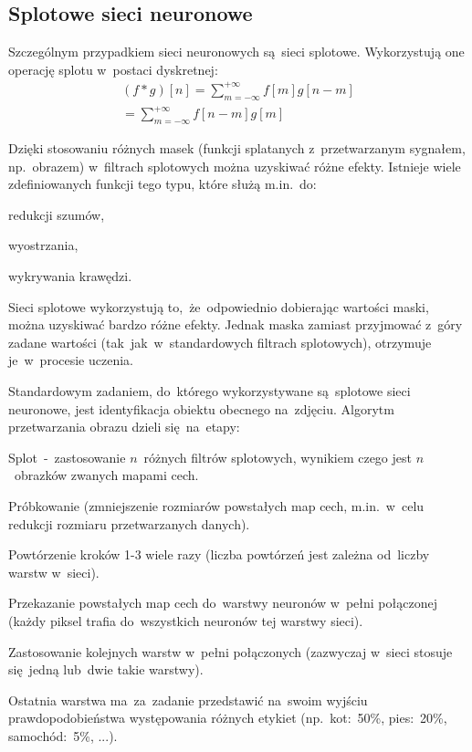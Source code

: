 \documentclass[oneside, 11pt, a4paper]{article}
\begin{document}
\begin{multicols}{2}
\section{Splotowe sieci neuronowe}
Szczególnym przypadkiem sieci neuronowych są~sieci splotowe. Wykorzystują one operację splotu w~postaci dyskretnej:
\begin{align*}
(f \ast g)[n] = \sum\limits_{m=-\infty}^{+\infty}f[m]g[n-m]\\
=\sum\limits_{m=-\infty}^{+\infty}f[n-m]g[m]
\end{align*}

Dzięki stosowaniu różnych masek (funkcji splatanych z~przetwarzanym sygnałem, np.~obrazem) w~filtrach splotowych można uzyskiwać różne efekty. Istnieje wiele zdefiniowanych funkcji tego typu, które służą m.in.~do:
\begin{compactitem}
	\item redukcji szumów,
	\item wyostrzania,
	\item wykrywania krawędzi.
\end{compactitem}

Sieci splotowe wykorzystują to,~że~odpowiednio dobierając wartości maski, można uzyskiwać bardzo różne efekty. Jednak maska zamiast przyjmować z~góry zadane wartości (tak~jak~w~standardowych filtrach splotowych), otrzymuje je~w~procesie uczenia.

Standardowym zadaniem, do~którego wykorzystywane są~splotowe sieci neuronowe, jest identyfikacja obiektu obecnego na~zdjęciu. Algorytm przetwarzania obrazu dzieli się~na~etapy:
\begin{compactenum}
	\item Splot~-~zastosowanie $n$~różnych filtrów splotowych, wynikiem czego jest $n$~obrazków zwanych mapami cech.
	\item Próbkowanie (zmniejszenie rozmiarów powstałych map cech, m.in.~w~celu redukcji rozmiaru przetwarzanych danych).
	\item Powtórzenie kroków 1-3 wiele razy (liczba powtórzeń jest zależna od~liczby warstw w~sieci).
	\item Przekazanie powstałych map cech do~warstwy neuronów w~pełni połączonej (każdy piksel trafia do~wszystkich neuronów tej warstwy sieci).
	\item Zastosowanie kolejnych warstw w~pełni połączonych (zazwyczaj w~sieci stosuje się~jedną lub~dwie takie warstwy).
\end{compactenum}

Ostatnia warstwa ma~za~zadanie przedstawić na~swoim wyjściu prawdopodobieństwa występowania różnych etykiet (np.~kot:~50\%, pies:~20\%, samochód:~5\%, ...).


\end{multicols}
\end{document}
